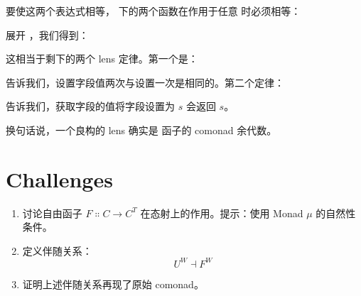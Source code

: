 要使这两个表达式相等， 下的两个函数在作用于任意  时必须相等：

展开 ，我们得到：

这相当于剩下的两个 lens 定律。第一个是：

告诉我们，设置字段值两次与设置一次是相同的。第二个定律：

告诉我们，获取字段的值将字段设置为 $s$ 会返回 $s$。

换句话说，一个良构的 lens 确实是  函子的 comonad 余代数。

\section{Challenges}

\begin{enumerate}
  \tightlist
  \item
  讨论自由函子 $F \Colon C \to C^T$ 在态射上的作用。提示：使用 Monad $\mu$ 的自然性条件。
  \item
  定义伴随关系：
  \[U^W \dashv F^W\]
  \item
  证明上述伴随关系再现了原始 comonad。
\end{enumerate}
